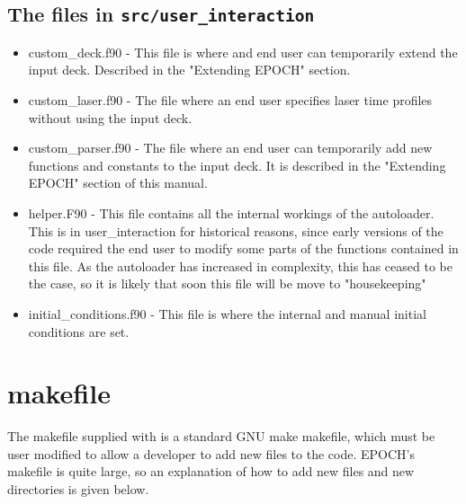 \documentclass[12pt,a4paper]{article}
\newcommand{\inlinecode}[1]{{\color{warwickred} \bf\texttt{#1}}}
\newcommand{\EPOCH}{{\color{warwickdark}\fontfamily{phv}\selectfont{EPOCH}}}
\begin{document}
\subsection{The files in \inlinecode{src/user\_interaction}}
\begin{itemize}
\item custom\_deck.f90 - This file is where and end user can temporarily
  extend the input deck. Described in the "Extending EPOCH" section.
\item custom\_laser.f90 - The file where an end user specifies laser time
  profiles without using the input deck.
\item custom\_parser.f90 - The file where an end user can temporarily add new
  functions and constants to the input deck. It is described in the "Extending
  EPOCH" section of this manual.
\item helper.F90 - This file contains all the internal workings of the
  autoloader. This is in user\_interaction for historical reasons, since early
  versions of the code required the end user to modify some parts of the
  functions contained in this file. As the autoloader has increased in
  complexity, this has ceased to be the case, so it is likely that soon this
  file will be move to "housekeeping"
\item initial\_conditions.f90 - This file is where the internal and manual
  initial conditions are set.
\end{itemize}

\section{{\EPOCH} makefile}
The makefile supplied with {\EPOCH} is a standard GNU make makefile, which must
be user modified to allow a developer to add new files to the code. EPOCH's
makefile is quite large, so an explanation of how to add new files and new
directories is given below.
\end{document}
